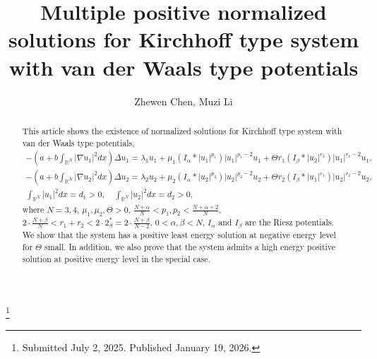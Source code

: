 \documentclass[reqno]{amsart}
\begin{document}
\title[\hfilneg EJDE-2026/06\hfil 
Kirchhoff type system with van der Waals type potentials]
{Multiple positive normalized solutions for Kirchhoff type system with
van der Waals type potentials}

\author[Z. Chen, M. Li \hfil EJDE-2026/06\hfilneg]
{Zhewen Chen, Muzi Li}

\address{Zhewen Chen (corresponding author) \newline
College of Science,
Jimei University,
Xiamen 361021, China}

\address{Muzi Li \newline
College of Mathematics and Statistics,
Fujian Normal University,
Qishan Campus, Fuzhou 350117, China}

\thanks{Submitted July 2, 2025. Published January 19, 2026.}

\begin{abstract}
This article shows the existence of normalized solutions for Kirchhoff type
system with van der Waals type potentials,
\begin{gather*}
-(a+b\int_{\mathbb{R}^N}|\nabla u_1|^2dx)\Delta u_1=\lambda_1 u_1+\mu_1(I_\alpha\ast|u_1|^{p_1})|u_1|^{p_1-2}u_1+
\Theta r_1(I_\beta\ast|u_2|^{r_2})|u_1|^{r_1-2}u_1, \\
-(a+b\int_{\mathbb{R}^N}|\nabla u_2|^2dx)\Delta u_2=\lambda_2 u_2+\mu_2(I_\alpha\ast|u_2|^{p_2})|u_2|^{p_2-2}u_2+
\Theta r_2(I_\beta\ast|u_1|^{r_1})|u_2|^{r_2-2}u_2, \\
\int_{\mathbb{R}^N}|u_1|^2dx=d_1>0,\quad
\int_{\mathbb{R}^N}|u_2|^2dx=d_2>0,
\end{gather*}
where $N=3,4$, $\mu_1,\mu_2,\Theta>0$, $\frac{N+\alpha}{N}<p_1,p_2<\frac{N+\alpha+2}{N}$,
$2\cdot\frac{N+\beta}{N}<r_1+r_2<2\cdot2_\beta^*=2\cdot\frac{N+\beta}{N-2}$,
$0<\alpha,\beta<N$, $I_\alpha$ and $I_\beta$ are the Riesz potentials.
We show that the system has a positive least energy solution at negative energy
level for $\Theta$ small. In addition, we also prove that the system admits a
high energy positive solution at positive energy level in the special case.
\end{abstract}

\maketitle
{}
\newtheorem{theorem}{Theorem}[section]
\newtheorem{lemma}[theorem]{Lemma}
\newtheorem{definition}[theorem]{Definition}
\newtheorem{remark}[theorem]{Remark}
\allowdisplaybreaks
\end{document}
